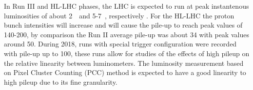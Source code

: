 In Run III and HL-LHC phases, the LHC is expected to run at peak instantenous luminosities of about 2\ \instlumiunit\ and 5-7\ \instlumiunit, respectively \cite{hllhc}.
For the HL-LHC the proton bunch intensities will increase and will cause the pile-up to reach peak values of 140-200, by comparison the Run II average pile-up was about 34 with peak values around 50. 
During 2018, runs with special trigger configuration were recorded with pile-up up to 100, these runs allow for studies of the effects of high pileup on the relative linearity between luminometers.
The luminosity measurement based on Pixel Cluster Counting (PCC) \cite{CMS-PAS-LUM-12-001,CMS-PAS-LUM-13-001} method is expected to have a good linearity to high pileup due to its fine granularity.  
